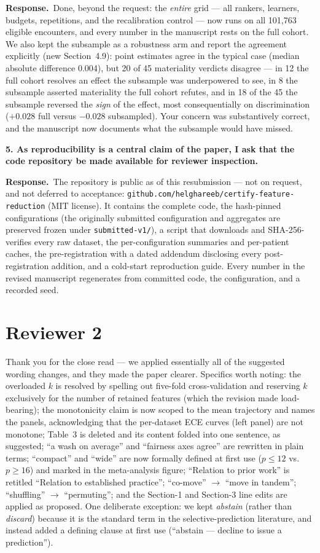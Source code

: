 \documentclass[11pt]{article}
\newcommand{\point}[1]{\par\medskip\noindent\textbf{\color{revblue}#1}\par\smallskip}
\newcommand{\reply}{\par\noindent\textbf{Response.}\ }
\begin{document}
\reply Done, beyond the request: the \emph{entire} grid --- all rankers, learners, budgets,
repetitions, and the recalibration control --- now runs on all 101{,}763 eligible encounters, and
every number in the manuscript rests on the full cohort. We also kept the subsample as a robustness
arm and report the agreement explicitly (new Section~4.9): point estimates agree in the typical
case (median absolute difference 0.004), but 20 of 45 materiality verdicts disagree --- in 12 the
full cohort resolves an effect the subsample was underpowered to see, in 8 the subsample asserted
materiality the full cohort refutes, and in 18 of the 45 the subsample reversed the \emph{sign} of
the effect, most consequentially on discrimination ($+0.028$ full versus $-0.028$ subsampled). Your concern was substantively correct, and the manuscript now documents what the
subsample would have missed.

\point{5. As reproducibility is a central claim of the paper, I ask that the code repository be made
available for reviewer inspection.}

\reply The repository is public as of this resubmission --- not on request, and not deferred to
acceptance: \texttt{github.com/helghareeb/certify-feature-reduction} (MIT license). It contains the complete
code, the hash-pinned configurations (the originally submitted configuration and aggregates are
preserved frozen under \texttt{submitted-v1/}), a script that downloads and SHA-256-verifies every
raw dataset, the per-configuration summaries and per-patient caches, the pre-registration with a
dated addendum disclosing every post-registration addition, and a cold-start reproduction guide.
Every number in the revised manuscript regenerates from committed code, the configuration, and a
recorded seed.

\section*{Reviewer 2}

Thank you for the close read --- we applied essentially all of the suggested wording changes, and
they made the paper clearer. Specifics worth noting: the overloaded $k$ is resolved by spelling out
five-fold cross-validation and reserving $k$ exclusively for the number of retained features (which
the revision made load-bearing); the monotonicity claim is now scoped to the mean trajectory and
names the panels, acknowledging that the per-dataset ECE curves (left panel) are not monotone;
Table~3 is deleted and its content folded into one sentence, as suggested; ``a wash on average'' and
``fairness axes agree'' are rewritten in plain terms; ``compact'' and ``wide'' are now formally
defined at first use ($p\le12$ vs.\ $p\ge16$) and marked in the meta-analysis figure; ``Relation to
prior work'' is retitled ``Relation to established practice''; ``co-move'' $\to$ ``move in
tandem''; ``shuffling'' $\to$ ``permuting''; and the Section-1 and Section-3 line edits are applied
as proposed. One deliberate exception: we kept \emph{abstain} (rather than \emph{discard}) because
it is the standard term in the selective-prediction literature, and instead added a defining clause
at first use (``abstain --- decline to issue a prediction'').
\end{document}
